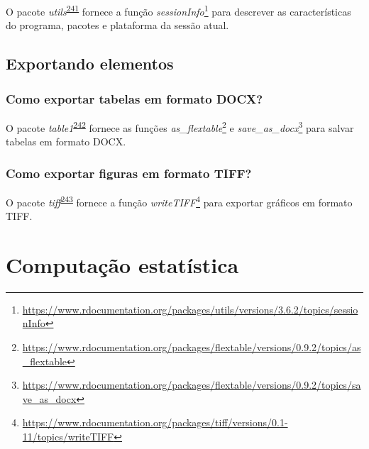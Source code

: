 \documentclass[
  a4paper,
]{book}
\renewcommand{\href}[2]{#2\footnote{\url{#1}}}
\newenvironment{infobox}[1]
  {
  \begin{itemize}
  \renewcommand{\labelitemi}{
    \raisebox{-.7\height}[0pt][0pt]{
      {\setkeys{Gin}{width=3em,keepaspectratio}
        \texttt{[image: \#1]}}
    }
  }
  \setlength{\fboxsep}{1em}
  \begin{blackbox}
  \item
  }
  {
  \end{blackbox}
  \end{itemize}
  }
\begin{document}
\begin{infobox}{images/Rlogo}
O pacote \emph{utils}\textsuperscript{\protect\hyperlink{ref-utils}{241}} fornece a função \href{https://www.rdocumentation.org/packages/utils/versions/3.6.2/topics/sessionInfo}{\emph{sessionInfo}} para descrever as características do programa, pacotes e plataforma da sessão atual.

\end{infobox}

\hypertarget{exportar}{%
\section{Exportando elementos}\label{exportar}}

\hypertarget{como-exportar-tabelas-em-formato-docx}{%
\subsection{Como exportar tabelas em formato DOCX?}\label{como-exportar-tabelas-em-formato-docx}}

\begin{infobox}{images/Rlogo}
O pacote \emph{table1}\textsuperscript{\protect\hyperlink{ref-flextable}{242}} fornece as funções \href{https://www.rdocumentation.org/packages/flextable/versions/0.9.2/topics/as_flextable}{\emph{as\_flextable}} e \href{https://www.rdocumentation.org/packages/flextable/versions/0.9.2/topics/save_as_docx}{\emph{save\_as\_docx}} para salvar tabelas em formato DOCX.

\end{infobox}

\hypertarget{como-exportar-figuras-em-formato-tiff}{%
\subsection{Como exportar figuras em formato TIFF?}\label{como-exportar-figuras-em-formato-tiff}}

\begin{infobox}{images/Rlogo}
O pacote \emph{tiff}\textsuperscript{\protect\hyperlink{ref-tiff}{243}} fornece a função \href{https://www.rdocumentation.org/packages/tiff/versions/0.1-11/topics/writeTIFF}{\emph{writeTIFF}} para exportar gráficos em formato TIFF.

\end{infobox}

\hypertarget{computacao-estatistica}{%
\chapter{\texorpdfstring{\textbf{Computação estatística}}{Computação estatística}}\label{computacao-estatistica}}
\end{document}
